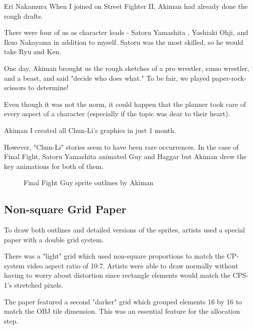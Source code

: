\begin{q}{Eri Nakamura\cite{sf2devinterview}}
When I joined on Street Fighter II, Akiman had already done the rough drafts. 

There were four of us as character leads - Satoru Yamashita , Yoshiaki Ohji, and Ikuo Nakayama in addition to myself. Satoru was the most skilled, so he would take Ryu and Ken. 

One day, Akiman brought us the rough sketches of a pro wrestler, sumo wrestler, and a beast, and said "decide who does what." To be fair, we played paper-rock-scissors to determine!
\end{q}



Even though it was not the norm, it could happen that the planner took care of every aspect of a character (especially if the topic was dear to their heart).

\begin{q}{Akiman\cite{gameMaestro4}}
I created all Chun-Li’s graphics in just 1 month.
\end{q}

However, "Chun-Li" stories seem to have been rare occurrences.   In the case of Final Fight, Satoru Yamashita animated Guy and Haggar but Akiman drew the key animations for both of them.



\begin{figure}[H]
\caption*{Final Fight Guy sprite outlines by Akiman}
\end{figure}




\subsection{Non-square Grid Paper}\label{artists_par}
To draw both outlines and detailed versions of the sprites, artists used a special paper with a double grid system.

There was a "light" grid which used non-square proportions to match the CP-system video aspect ratio of 10:7. Artists were able to draw normally without having to worry about distortion since rectangle elements would match the CPS-1's stretched pixels. 

The paper featured a second "darker" grid which grouped elements 16 by 16 to match the OBJ tile dimension. This was an essential feature for the allocation step.





